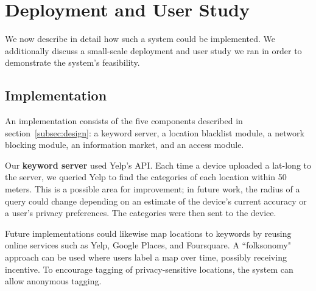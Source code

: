 \section{Deployment and User Study}
\label{sec:user-study}


We now describe in detail how such a system could be implemented.
We additionally discuss a small-scale deployment and user study we ran in order to demonstrate the system's feasibility.

\subsection{Implementation}
\label{subsec:implementation}
An implementation consists of the five components described in section~\ref{subsec:design}:
a keyword server, a location blacklist module, a network blocking module, an information market, and an access module.

Our \textbf{keyword server} used Yelp's API.
Each time a device uploaded a lat-long to the server, we queried Yelp to find the categories of each location within 50 meters.
This is a possible area for improvement; in future work, the radius of a query could change depending on an estimate of the device's current accuracy or a user's privacy preferences.
The categories were then sent to the device.

Future implementations could likewise map locations to keywords by reusing online services such as Yelp, Google Places, and Foursquare.
A ``folksonomy" approach can be used where users label a map over time, possibly receiving incentive. To encourage tagging of privacy-sensitive locations, the system can allow anonymous tagging. 

